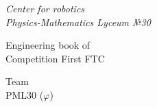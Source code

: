 \thispagestyle{titlestyle}
\begin{titlepage}
	\newpage
	
	\begin{center}
		\LARGE\textit{Center for robotics \\ Physics-Mathematics Lyceum №30}
		
		\vspace{8em}
		
		\LARGE{Engineering  book of \\ Competition First FTC}
		
		\vspace{4em}
		
		Team \\ PML30 (${\varphi}$)
		
	\end{center}
\end{titlepage}

\newpage
